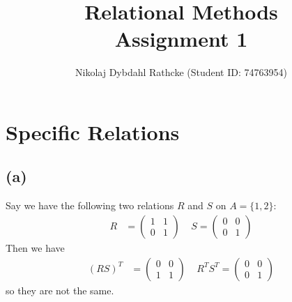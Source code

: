 \documentclass[a4paper, fleqn]{article}
\author{Nikolaj Dybdahl Rathcke (Student ID: 74763954)}
\title{Relational Methods \\ Assignment 1}
\begin{document}
\maketitle

\section{Specific Relations}
\subsection{(a)}
Say we have the following two relations $R$ and $S$ on $A=\{1,2\}$:
\begin{align*}
  R&=
  \begin{pmatrix}
    1 & 1 \\
    0 & 1
  \end{pmatrix}
  \ \ \ \ \
  S=
  \begin{pmatrix}
    0 & 0 \\
    0 & 1
  \end{pmatrix}
\end{align*}
Then we have
\begin{align*}
  (RS)^T&=
  \begin{pmatrix}
    0 & 0 \\
    1 & 1
  \end{pmatrix}
  \ \ \ \ \
  R^TS^T=
  \begin{pmatrix}
    0 & 0 \\
    0 & 1
  \end{pmatrix}
\end{align*}
so they are not the same.
\end{document}
